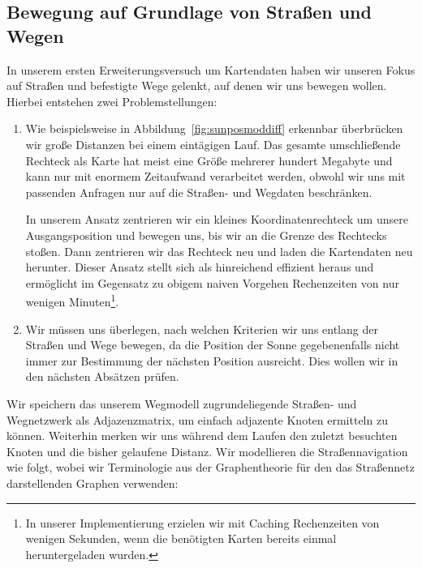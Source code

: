 \documentclass[
    paper=a4,
    DIV14,
    fontsize=12pt,
    pagesize=pdftex,
    toc=bibliographynumbered
]{scrartcl}
\numberwithin{figure}{section}
\numberwithin{equation}{section}
\numberwithin{table}{section}
\begin{document}
\subsection{Bewegung auf Grundlage von Straßen und Wegen}
In unserem ersten Erweiterungsversuch um Kartendaten haben wir unseren Fokus auf Straßen
und befestigte Wege gelenkt, auf denen wir uns bewegen wollen. Hierbei entstehen zwei
Problemstellungen:
\begin{enumerate}[label=\arabic*.,leftmargin=1.5em]
    \item Wie beispielsweise in Abbildung~\ref{fig:sunposmoddiff} erkennbar überbrücken wir
        große Distanzen bei einem eintägigen Lauf. Das gesamte umschließende Rechteck als
        Karte hat meist eine Größe mehrerer hundert Megabyte und kann nur mit enormem
        Zeitaufwand verarbeitet werden, obwohl wir uns mit passenden Anfragen nur auf die
        Straßen- und Wegdaten beschränken.

        In unserem Ansatz zentrieren wir ein kleines Koordinatenrechteck um unsere
        Ausgangsposition und bewegen uns, bis wir an die Grenze des Rechtecks stoßen. Dann
        zentrieren wir das Rechteck neu und laden die Kartendaten neu herunter. Dieser
        Ansatz stellt sich als hinreichend effizient heraus und ermöglicht im Gegensatz
        zu obigem naiven Vorgehen Rechenzeiten von nur wenigen Minuten\footnote{In unserer
        Implementierung erzielen wir mit Caching Rechenzeiten von wenigen Sekunden, wenn
        die benötigten Karten bereits einmal heruntergeladen wurden.}.
    \item Wir müssen uns überlegen, nach welchen Kriterien wir uns entlang der Straßen und
        Wege bewegen, da die Position der Sonne gegebenenfalls nicht immer zur Bestimmung
        der nächsten Position ausreicht. Dies wollen wir in den nächsten Absätzen prüfen.
\end{enumerate}
Wir speichern das unserem Wegmodell zugrundeliegende Straßen- und Wegnetzwerk als
Adjazenzmatrix, um einfach adjazente Knoten ermitteln zu können. Weiterhin merken wir uns
während dem Laufen den zuletzt besuchten Knoten und die bisher gelaufene Distanz. Wir
modellieren die Straßennavigation wie folgt, wobei wir Terminologie aus der Graphentheorie
für den das Straßennetz darstellenden Graphen verwenden:
\end{document}
